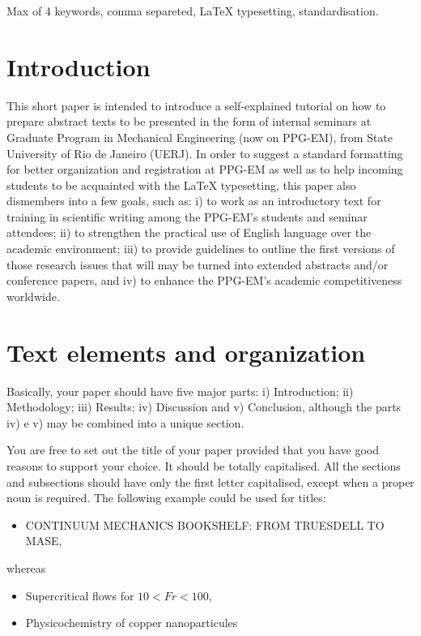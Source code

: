 \documentclass[date]{ppgem}
\begin{document}
\thispagestyle{plain}
\makeheader

\begin{multicols}{2}

\begin{keywords}
Max of 4 keywords, comma separeted, {\LaTeX} typesetting, standardisation.
\end{keywords}

\section{Introduction}

This short paper is intended to introduce a self-explained tutorial on
how to prepare abstract texts to be presented in the form of internal
seminars at Graduate Program in Mechanical Engineering (now on PPG-EM),
from State University of Rio de Janeiro (UERJ). In order to suggest a
standard formatting for better organization and registration at PPG-EM
as well as to help incoming students to be acquainted with the {\LaTeX}
typesetting, this paper also dismembers into a few goals, such as: i) to
work as an introductory text for training in scientific writing among
the PPG-EM's students and seminar attendees; ii) to strengthen the
practical use of English language over the academic environment; iii) to
provide guidelines to outline the first versions of those research
issues that will may be turned into extended abstracts and/or conference
papers, and iv) to enhance the PPG-EM's academic competitiveness
worldwide. 

\section{Text elements and organization}

Basically, your paper should have five major parts: i) Introduction; ii)
Methodology; iii) Results; iv) Discussion and v) Conclusion, although
the parts iv) e v) may be combined into a unique section. 

You are free to set out the title of your paper provided that you have
good reasons to support your choice. It should be totally capitalised.
All the sections and subsections should have only the first letter
capitalised, except when a proper noun is required. The following
example could be used for titles:

\begin{itemize}
\item CONTINUUM MECHANICS BOOKSHELF: FROM TRUESDELL TO MASE, 
\end{itemize}
whereas
\begin{itemize}
\item  Supercritical flows for $ 10 < Fr < 100 $, \\
\item  Physicochemistry of copper nanoparticules  \\
\end{itemize}


\end{multicols}
\end{document}
